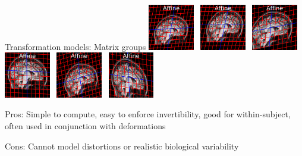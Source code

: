 \documentclass{beamer}
\begin{document}
\begin{frame}{Transformation models: Matrix groups}
\includegraphics[width=0.15\textwidth]{tform_models_affine_1}~
\includegraphics[width=0.15\textwidth]{tform_models_affine_2}~
\includegraphics[width=0.15\textwidth]{tform_models_affine_3}~
\includegraphics[width=0.15\textwidth]{tform_models_affine_4}~
\includegraphics[width=0.15\textwidth]{tform_models_affine_5}~
\includegraphics[width=0.15\textwidth]{tform_models_affine_6}

\alert{Pros}: Simple to compute, easy to enforce invertibility, good for within-subject, often used in conjunction with deformations

\alert{Cons}: Cannot model distortions or realistic biological variability


\end{frame}
\end{document}
